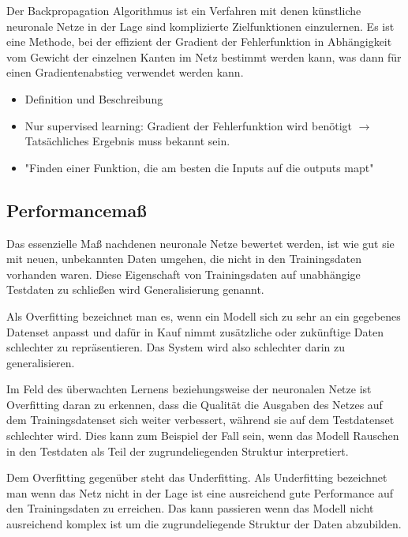 Der Backpropagation Algorithmus ist ein Verfahren mit denen künstliche neuronale Netze in der Lage sind komplizierte Zielfunktionen einzulernen.
Es ist eine Methode, bei der effizient der Gradient der Fehlerfunktion in Abhängigkeit vom Gewicht der einzelnen Kanten im Netz bestimmt werden kann,
was dann für einen Gradientenabstieg verwendet werden kann. 

\color{blue}
\begin{itemize}
	\item Definition und Beschreibung
	\item Nur supervised learning: Gradient der Fehlerfunktion wird benötigt \(\rightarrow\) Tatsächliches Ergebnis muss bekannt sein.
	\item "Finden einer Funktion, die am besten die Inputs auf die outputs mapt"
\end{itemize}
\color{black}

\subsection{Performancemaß}

Das essenzielle Maß nachdenen neuronale Netze bewertet werden, ist wie gut sie mit neuen, unbekannten Daten umgehen, die nicht in den Trainingsdaten vorhanden waren. 
Diese Eigenschaft von Trainingsdaten auf unabhängige Testdaten zu schließen wird Generalisierung genannt. 

Als Overfitting bezeichnet man es, wenn ein Modell sich zu sehr an ein gegebenes Datenset anpasst und 
dafür in Kauf nimmt zusätzliche oder zukünftige Daten schlechter zu repräsentieren.
Das System wird also schlechter darin zu generalisieren.

Im Feld des überwachten Lernens beziehungsweise der neuronalen Netze ist Overfitting daran zu erkennen,
dass die Qualität die Ausgaben des Netzes auf dem Trainingsdatenset sich weiter verbessert,
während sie auf dem Testdatenset schlechter wird.
Dies kann zum Beispiel der Fall sein, wenn das Modell Rauschen in den Testdaten als Teil der zugrundeliegenden Struktur interpretiert. 


Dem Overfitting gegenüber steht das Underfitting. 
Als Underfitting bezeichnet man wenn das Netz nicht in der Lage ist
eine ausreichend gute Performance auf den Trainingsdaten zu erreichen.
Das kann passieren wenn das Modell nicht ausreichend komplex ist um die zugrundeliegende Struktur der Daten abzubilden.


